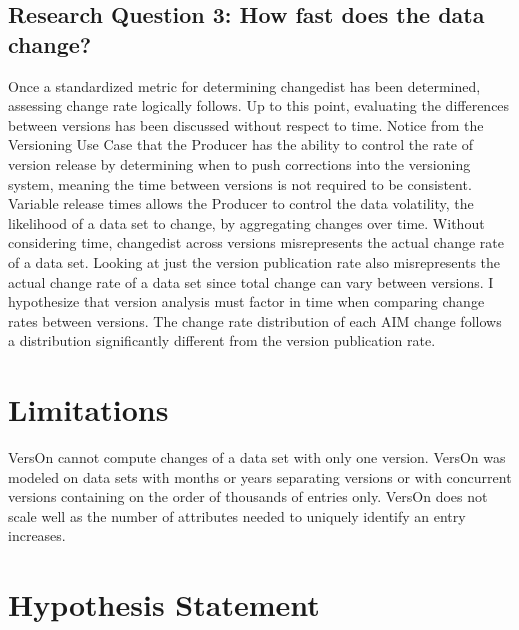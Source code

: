 \subsection{Research Question 3: How fast does the data change?}

Once a standardized metric for determining \gls{changedist} has been determined, assessing change rate logically follows.
Up to this point, evaluating the differences between versions has been discussed without respect to time.
Notice from the Versioning Use Case that the Producer has the ability to control the rate of version release by determining when to push corrections into the versioning system, meaning the time between \glspl{version} is not required to be consistent.
Variable release times allows the Producer to control the data volatility, the likelihood of a data set to change, by aggregating changes over time.
Without considering time, \gls{changedist} across \glspl{version} misrepresents the actual change rate of a data set.
Looking at just the version publication rate also misrepresents the actual change rate of a data set since total change can vary between \glspl{version}.
I hypothesize that version analysis must factor in time when comparing change rates between \glspl{version}.
The change rate distribution of each \gls{AIM} \gls{change} follows a distribution significantly different from the version publication rate.

\section{Limitations}
VersOn cannot compute changes of a data set with only one version.
VersOn was modeled on data sets with months or years separating versions or with concurrent versions containing on the order of thousands of entries only.
VersOn does not scale well as the number of attributes needed to uniquely identify an entry increases.

\section{Hypothesis Statement}

